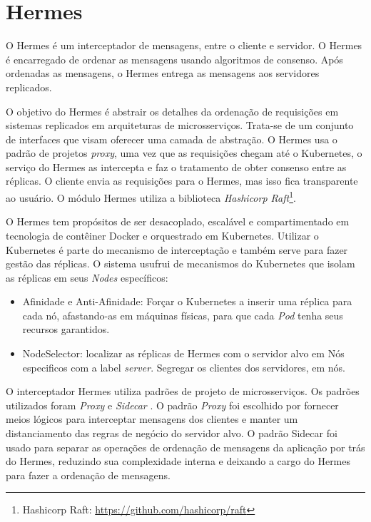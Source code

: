 \chapter{Hermes}
\label{cap:hermes}

O Hermes \cite{renan2021hermes} é um interceptador de mensagens, entre o cliente e servidor. O Hermes é encarregado de ordenar as mensagens usando algoritmos de consenso. Após ordenadas as mensagens, o Hermes entrega as mensagens aos servidores replicados.

O objetivo do Hermes é abstrair os detalhes da ordenação de requisições em sistemas replicados em arquiteturas de microsserviços. Trata-se de um conjunto de interfaces que visam oferecer uma camada de abstração. O Hermes usa o padrão de projetos \textit{proxy}, uma vez que as requisições chegam até o Kubernetes, o serviço do Hermes as intercepta e faz o tratamento de obter consenso entre as réplicas. O cliente envia as requisições para o Hermes, mas isso fica transparente ao usuário. O módulo Hermes utiliza a biblioteca \textit{Hashicorp Raft}\footnote{Hashicorp Raft: \url{https://github.com/hashicorp/raft}}.


O Hermes tem propósitos de ser desacoplado, escalável e compartimentado em tecnologia de contêiner Docker e orquestrado em Kubernetes. Utilizar o Kubernetes é parte do mecanismo de interceptação e também serve para fazer gestão das réplicas. O sistema usufrui de mecanismos do Kubernetes que isolam as réplicas em seus \textit{Nodes} específicos:

\begin{itemize}
\item Afinidade e Anti-Afinidade: Forçar o Kubernetes a inserir uma réplica para cada nó, afastando-as em máquinas físicas, para que cada \textit{Pod} tenha seus recursos garantidos.
\item NodeSelector: localizar as réplicas de Hermes com o servidor alvo em Nós especificos com a label \textit{server}. Segregar os clientes dos servidores, em nós.
\end{itemize}

O interceptador Hermes utiliza padrões de projeto de microsserviços. Os padrões utilizados foram \textit{Proxy} \cite{chelliah2017architectural} e \textit{Sidecar} \cite{Sidecarp49:online}. O padrão \textit{Proxy} foi escolhido por fornecer meios lógicos para interceptar mensagens dos clientes e manter um distanciamento das regras de negócio do servidor alvo. O padrão Sidecar foi usado para separar as operações de ordenação de mensagens da aplicação por trás do Hermes, reduzindo sua complexidade interna e deixando a cargo do Hermes para fazer a ordenação de mensagens.

